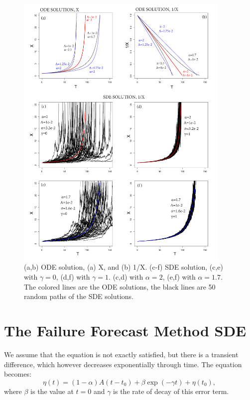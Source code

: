 \documentclass{article}
\begin{document}
\begin{figure}%
\centering
\includegraphics[width=0.92\textwidth]{Fig1_plus.png}
\caption{(a,b) ODE solution, (a) X, and (b) 1/X. (c-f) SDE solution, (c,e) with $\gamma=0$, (d,f) with $\gamma=1$. (c,d) with $\alpha=2$, (e,f) with $\alpha=1.7$. The colored lines are the ODE solutions, the black lines are 50 random paths of the SDE solutions.}
\label{Fig1}
\end{figure}

\section{The Failure Forecast Method SDE}
We assume that the equation is not exactly satisfied, but there is a transient difference, which however decreases exponentially through time. The equation becomes:
$$\eta(t)=(1-\alpha)A(t-t_0) +\beta\exp(-\gamma t)+\eta(t_0),$$
where $\beta$ is the value at $t=0$ and $\gamma$ is the rate of decay of this error term.
\end{document}
